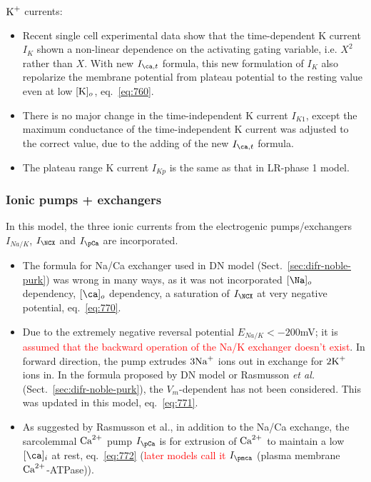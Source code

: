 $\ce{K+}$ currents:
\begin{itemize}
\item Recent single cell experimental data show that the time-dependent K
  current $I_{K}$ shown a non-linear dependence on the activating gating
  variable, i.e. $X^2$ rather than $X$. With new $I_{\ca,t} $ formula, this
  new formulation of $I_{K}$ also repolarize the membrane potential from
  plateau potential to the resting value even at low $[\ce{K}]_o$,
  eq.~\eqref{eq:760}.

\item There is no major change in the time-independent K current
  $I_{K1}$, except the maximum conductance of the time-independent K
  current was adjusted to the correct value, due to the adding of the new
  $I_{\ca,t} $ formula.

\item The plateau range K current $I_{Kp}$ is the same as that in
  LR-phase 1 model.
\end{itemize}

\subsubsection{Ionic pumps + exchangers}

In this model, the three ionic currents from the electrogenic
pumps/exchangers $I_{Na/K}$, $I_\NCX$ and $I_\pCa$ are
incorporated.
\begin{itemize}
\item The formula
  for Na/Ca exchanger used in DN model (Sect.~\ref{sec:difr-noble-purk})
  was wrong in many ways, as it was not incorporated $[\Na]_o$
  dependency, $[\ca]_o$ dependency, a saturation of $I_\NCX$ at
  very negative potential, eq.~\eqref{eq:770}.

\item Due to the extremely negative reversal potential
  $E_{Na/K}<-200$mV; it is
  \textcolor{red}{assumed that the backward operation of the Na/K
    exchanger doesn't exist}. In forward direction, the pump extrudes
    $3\ce{Na+}$ ions out in exchange for $2\ce{K+}$ ions in. In the formula
    proposed by DN model or Rasmusson {\it et al.}
    (Sect.~\ref{sec:difr-noble-purk}), the $V_m$-dependent has not
    been considered. This was updated in this model,
    eq.~\eqref{eq:771}.

\item As suggested by Rasmusson et al., in addition to the Na/Ca
  exchange, the sarcolemmal ${\text{Ca}^{2+}}$ pump $I_\pCa$ is for extrusion of ${\text{Ca}^{2+}}$ to
  maintain a low $[\ca]_i$ at rest, eq.~\eqref{eq:772} (\textcolor{red}{later
  models call it} $I_\pmca$ (plasma membrane
    ${\text{Ca}^{2+}}$-ATPase)).
\end{itemize}

